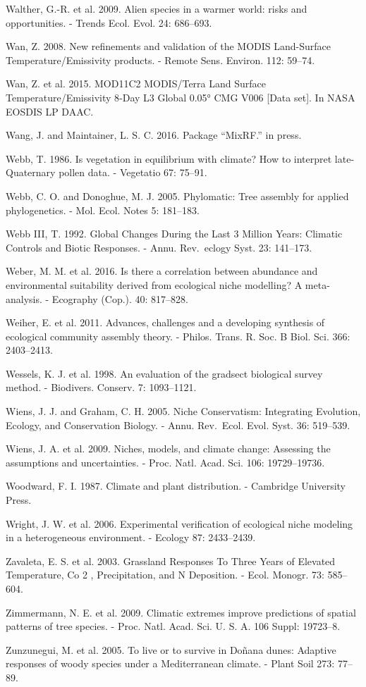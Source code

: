 \documentclass[11pt,twoside]{reedthesis}
\begin{document}
Walther, G.-R. et al. 2009. Alien species in a warmer world: risks and
opportunities. - Trends Ecol. Evol. 24: 686--693.\par
Wan, Z. 2008. New refinements and validation of the MODIS Land-Surface
Temperature/Emissivity products. - Remote Sens. Environ. 112:
59--74.\par
Wan, Z. et al. 2015. MOD11C2 MODIS/Terra Land Surface
Temperature/Emissivity 8‐Day L3 Global 0.05° CMG V006 {[}Data set{]}. In
NASA EOSDIS LP DAAC.\par
Wang, J. and Maintainer, L. S. C. 2016. Package ``MixRF.'' in press.\par
Webb, T. 1986. Is vegetation in equilibrium with climate? How to
interpret late-Quaternary pollen data. - Vegetatio 67: 75--91.\par
Webb, C. O. and Donoghue, M. J. 2005. Phylomatic: Tree assembly for
applied phylogenetics. - Mol. Ecol. Notes 5: 181--183.\par
Webb III, T. 1992. Global Changes During the Last 3 Million Years:
Climatic Controls and Biotic Responses. - Annu. Rev.~eclogy Syst. 23:
141--173.\par
Weber, M. M. et al. 2016. Is there a correlation between abundance and
environmental suitability derived from ecological niche modelling? A
meta-analysis. - Ecography (Cop.). 40: 817--828.\par
Weiher, E. et al. 2011. Advances, challenges and a developing synthesis
of ecological community assembly theory. - Philos. Trans. R. Soc. B
Biol. Sci. 366: 2403--2413.\par
Wessels, K. J. et al. 1998. An evaluation of the gradsect biological
survey method. - Biodivers. Conserv. 7: 1093--1121.\par
Wiens, J. J. and Graham, C. H. 2005. Niche Conservatism: Integrating
Evolution, Ecology, and Conservation Biology. - Annu. Rev.~Ecol. Evol.
Syst. 36: 519--539.\par
Wiens, J. A. et al. 2009. Niches, models, and climate change: Assessing
the assumptions and uncertainties. - Proc. Natl. Acad. Sci. 106:
19729--19736.\par
Woodward, F. I. 1987. Climate and plant distribution. - Cambridge
University Press.\par
Wright, J. W. et al. 2006. Experimental verification of ecological niche
modeling in a heterogeneous environment. - Ecology 87: 2433--2439.\par
Zavaleta, E. S. et al. 2003. Grassland Responses To Three Years of
Elevated Temperature, Co 2 , Precipitation, and N Deposition. - Ecol.
Monogr. 73: 585--604.\par
Zimmermann, N. E. et al. 2009. Climatic extremes improve predictions of
spatial patterns of tree species. - Proc. Natl. Acad. Sci. U. S. A. 106
Suppl: 19723--8.\par
Zunzunegui, M. et al. 2005. To live or to survive in Doñana dunes:
Adaptive responses of woody species under a Mediterranean climate. -
Plant Soil 273: 77--89.\par
\end{document}
